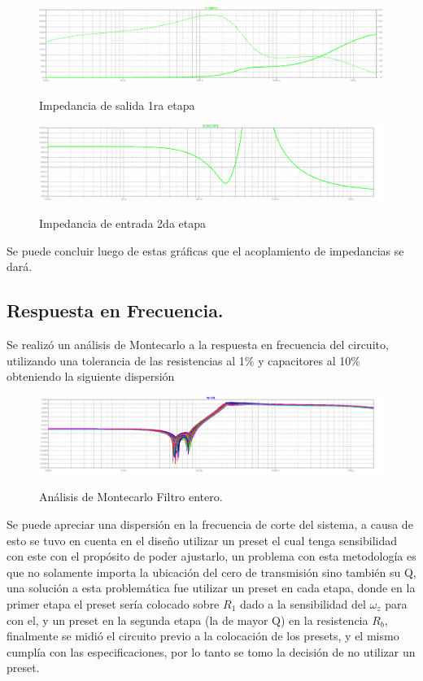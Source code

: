 \begin{figure}[H]
	\centering
	\includegraphics[width=\textwidth]{Imagenes-Ej3/ZoutE1.png}
	\label{fig:zoute1}
	\caption{Impedancia de salida 1ra etapa}
\end{figure}

\begin{figure}[H]
	\centering
	\includegraphics[width=\textwidth]{Imagenes-Ej3/ZinE2.png}
	\label{fig:zine2}
	\caption{Impedancia de entrada 2da etapa}
\end{figure}
Se puede concluir luego de estas gráficas que el acoplamiento de impedancias se dará.
\subsection{Respuesta en Frecuencia.}
Se realizó un análisis de Montecarlo a la respuesta en frecuencia del circuito, utilizando una tolerancia de las resistencias al 1$\%$ y capacitores al 10$\%$ obteniendo la siguiente dispersión
\begin{figure}[H]
	\centering
	\includegraphics[width=\textwidth]{Imagenes-Ej3/mcsedra.png}
	\label{fig:mcsedra}
	\caption{Análisis de Montecarlo Filtro entero.}
\end{figure}
Se puede apreciar una dispersión en la frecuencia de corte del sistema, a causa de esto se tuvo en cuenta en el diseño utilizar un preset el cual tenga sensibilidad con este con el propósito de poder ajustarlo, un problema con esta metodología es que no solamente importa la ubicación del cero de transmisión sino también su Q, una solución a esta problemática fue utilizar un preset en cada etapa, donde en la primer etapa el preset sería colocado sobre $R_1$ dado a la sensibilidad del $\omega_z$ para con el, y un preset en la segunda etapa (la de mayor Q) en la resistencia  $R_b$, finalmente se midió el circuito previo a la colocación de los presets, y el mismo cumplía con las especificaciones, por lo tanto se tomo la decisión de no utilizar un preset. 
